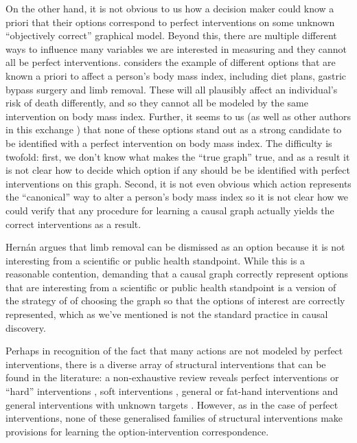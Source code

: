 \documentclass[USenglish,onecolumn]{article}
\begin{document}

On the other hand, it is not obvious to us how a decision maker could know a priori that their options correspond to perfect interventions on some unknown ``objectively correct'' graphical model. Beyond this, there are multiple different ways to influence many variables we are interested in measuring and they cannot all be perfect interventions. \citet{hernan_does_2008,noauthor_does_2016} considers the example of different options that are known a priori to affect a person's body mass index, including diet plans, gastric bypass surgery and limb removal. These will all plausibly affect an individual's risk of death differently, and so they cannot all be modeled by the same intervention on body mass index. Further, it seems to us (as well as other authors in this exchange \citep{pearl_does_2018,hernanInvitedCommentaryCausal2009,shahar_association_2009}) that none of these options stand out as a strong candidate to be identified with a perfect intervention on body mass index. The difficulty is twofold: first, we don't know what makes the ``true graph'' true, and as a result it is not clear how to decide which option if any should be be identified with perfect interventions on this graph. Second, it is not even obvious which action represents the ``canonical'' way to alter a person's body mass index so it is not clear how we could verify that any procedure for learning a causal graph actually yields the correct interventions as a result.

Hernán argues that limb removal can be dismissed as an option because it is not interesting from a scientific or public health standpoint. While this is a reasonable contention, demanding that a causal graph correctly represent options that are interesting from a scientific or public health standpoint is a version of the strategy of of choosing the graph so that the options of interest are correctly represented, which as we've mentioned is not the standard practice in causal discovery.

Perhaps in recognition of the fact that many actions are not modeled by perfect interventions, there is a diverse array of structural interventions that can be found in the literature: a non-exhaustive review reveals perfect interventions or ``hard'' interventions \citep[ch. ~1]{pearl_causality:_2009,hauser_characterization_2012}, soft interventions \citep{correa_calculus_2020,eberhardt_interventions_2007}, general or fat-hand interventions \citep{eberhardt_interventions_2007,yang_characterizing_2018,glymour_evaluating_2017} and general interventions with unknown targets \citep{brouillard_differentiable_2020}. However, as in the case of perfect interventions, none of these generalised families of structural interventions make provisions for learning the option-intervention correspondence.
\end{document}
